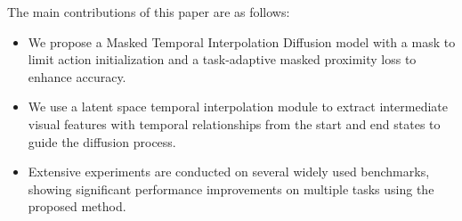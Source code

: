 The main contributions of this paper are as follows:
\begin{itemize}[leftmargin=*]
\vspace{-2mm}
    \item We propose a Masked Temporal Interpolation Diffusion model with a mask to limit action initialization and a task-adaptive masked proximity loss to enhance accuracy.
    
    \item We use a latent space temporal interpolation module to extract intermediate visual features with temporal relationships from the start and end states to guide the diffusion process.
    
    \item Extensive experiments are conducted on several widely used benchmarks, showing significant performance improvements on multiple tasks using the proposed method.
\end{itemize}



